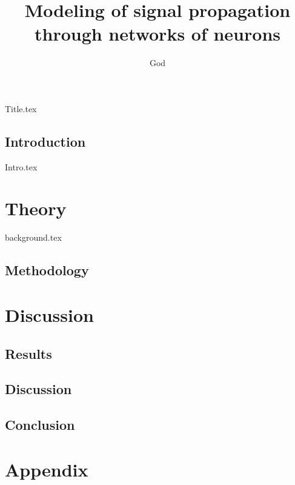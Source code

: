 \documentclass[printing, unit]{_NoTouch/_MyProject}
\title{Modeling of signal propagation through networks of neurons}
\author{God}
\begin{document}

{Title.tex}
\tableofcontents

\printglossary[type=\acronymtype]







\newpage
{}
\chapter*{Introduction} 
{Intro.tex}

\part{Theory}

{background.tex}

\newpage
\chapter{Methodology}


\newpage
\part{Discussion}
\chapter{Results}


\newpage
\chapter{Discussion}

\newpage
\chapter{Conclusion}


\appendix
\part{Appendix}
\end{document}
